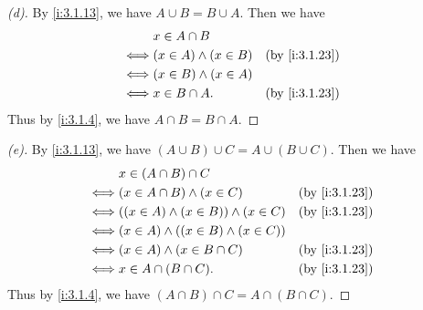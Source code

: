 \begin{proof}[(d)]
  By \cref{i:3.1.13}, we have \(A \cup B = B \cup A\).
  Then we have
  \begin{align*}
         & x \in A \cap B                               \\
    \iff & (x \in A) \land (x \in B) &  & \by{i:3.1.23} \\
    \iff & (x \in B) \land (x \in A)                    \\
    \iff & x \in B \cap A.           &  & \by{i:3.1.23}
  \end{align*}
  Thus by \cref{i:3.1.4}, we have \(A \cap B = B \cap A\).
\end{proof}

\begin{proof}[(e)]
  By \cref{i:3.1.13}, we have \((A \cup B) \cup C = A \cup (B \cup C)\).
  Then we have
  \begin{align*}
         & x \in (A \cap B) \cap C                                        \\
    \iff & (x \in A \cap B) \land (x \in C)            &  & \by{i:3.1.23} \\
    \iff & ((x \in A) \land (x \in B)) \land (x \in C) &  & \by{i:3.1.23} \\
    \iff & (x \in A) \land ((x \in B) \land (x \in C))                    \\
    \iff & (x \in A) \land (x \in B \cap C)            &  & \by{i:3.1.23} \\
    \iff & x \in A \cap (B \cap C).                    &  & \by{i:3.1.23}
  \end{align*}
  Thus by \cref{i:3.1.4}, we have \((A \cap B) \cap C = A \cap (B \cap C)\).
\end{proof}

